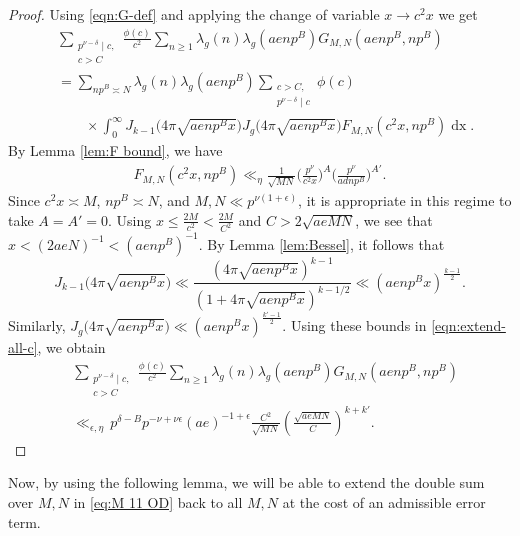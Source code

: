 \documentclass[12pt]{amsart}
\theoremstyle{plain}
\theoremstyle{definition}
\begin{document}


\begin{proof}
Using \eqref{eqn:G-def} and applying the change of variable $x\to c^2x$ we get
    \begin{align}\label{eqn:extend-all-c}
  & \sum_{\substack{p^{\nu-\delta} \mid c, \\ c> C}}
    \frac{\phi(c)}{c^2}
      \sum_{n \geq 1}  \lambda_g(n) \lambda_g(aenp^B)
G_{M,N}(aenp^B, np^B) \nonumber   \\&=    
        \sum_{np^B \asymp N}  \lambda_g(n) \lambda_g(aenp^B) 
   \sum_{\substack{c > C, \\ p^{\nu-\delta} \mid c}}
        \phi(c) \nonumber\\&\hspace{2em}\times\int_0^\infty 
         J_{k-1}\big(4\pi\sqrt{aenp^Bx}\big)
        J_g\big(4\pi\sqrt{aenp^Bx}\big)
       F_{M, N}(c^2x, np^B)
            \mathop{dx}.
    \end{align}
By Lemma \ref{lem:F bound}, we have
    \begin{align*}
    F_{M, N}(c^2x, np^B)
    \ll_{\eta} \frac{ 1 }{\sqrt{MN}}
    \Big(\frac{p^\nu}{c^2 x}\Big)^A
    \Big(\frac{p^\nu }{adnp^B}\Big)^{A'}.
    \end{align*}
Since $c^2x\asymp M$, $np^{B}\asymp N$, and $M,N\ll p^{\nu(1+\epsilon)}$, it is appropriate in this regime to take $A=A'=0$.
Using $x\leq  \frac{2M}{c^2}<\frac{2M}{C^2}$ and $C>2\sqrt{aeMN}$, we see that $x< (2aeN)^{-1}<(aenp^B)^{-1}$. By Lemma \ref{lem:Bessel}, it follows that
\[
     J_{k-1}\big(4\pi\sqrt{aenp^Bx}\big)
     \ll
    \frac{(4\pi\sqrt{aenp^Bx})^{k-1}}{(1+4\pi\sqrt{aenp^Bx})^{k-1/2}}
    \ll (aenp^Bx)^{\frac{k-1}{2}}.
\]
Similarly, $J_g\big(4\pi\sqrt{aenp^Bx}\big)\ll (aenp^Bx)^{\frac{k'-1}{2}}$. Using these bounds in \eqref{eqn:extend-all-c}, we obtain
    \begin{align*}
   & \sum_{\substack{p^{\nu-\delta} \mid c, \\ c> C}}
    \frac{\phi(c)}{c^2}
    \sum_{n \geq 1}  \lambda_g(n) \lambda_g(aenp^B)
G_{M,N}(aenp^B, np^B)  
   \\& \ll_{\epsilon,\eta} \, p^{\delta-B}p^{-\nu+\nu\epsilon} (ae)^{-1+\epsilon}\frac{C^{2}}{\sqrt{MN}}\left(\frac{\sqrt{aeMN}}{C}\right)^{k+k'}.
 \end{align*}
\end{proof}


Now, by using the following lemma, we will be able to extend the double sum over $M, N $  in \eqref{eq:M 11 OD} back to all $M, N$ at the cost of an admissible error term.
\end{document}
